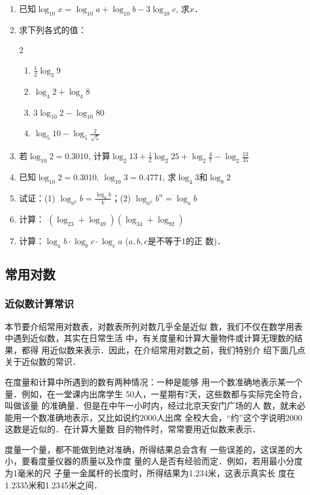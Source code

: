 \begin{enumerate}
\item 已知$\log_{10} x=\log_{10} a+\log_{10} b-3\log_{10} c$, 求$x$．
\item 求下列各式的值：
\begin{multicols}{2}
\begin{enumerate}
    \item $\frac{1}{2}\log_{3} 9$
    \item $\log_{4} 2+\log_{4} 8$
    \item $3\log_{10} 2-\log_{10} 80$
    \item $\log_{5} 10-\log_{5}\frac{2}{\sqrt{5}} $
\end{enumerate}
\end{multicols}
\item 若$\log_{10} 2=0.3010$,
计算$\log_{2} 13+\frac{1}{2}\log_{2} 25+\log_{2} \frac{4}{7}-\log_{2}\frac{13}{35} $
\item 已知$\log_{10} 2=0.3010$, $\log_{10}3=0.4771$,
求$\log_4 3$和$\log_8 2$

\item  试证：(1) $\log_{a^k}b=\frac{\log_ab}{k}$；\quad (2) $\log_{a^n}b^n=\log_ab$

\item 计算：
$(\log_23+\log_49)(\log_34 +\log_92)$
\item 计算：$\log_ab\cdot \log_b c\cdot \log_ca$ ($a,b,c$是不等于1的正
数)．
\end{enumerate}  

\subsection{常用对数}
\subsubsection{近似数计算常识}
本节要介绍常用对数表，对数表所列对数几乎全是近似
数，我们不仅在数学用表中遇到近似数，其实在日常生活
中，有关度量和计算大量物件或计算无理数的结果，都得
用近似数来表示．因此，在介绍常用对数之前，我们特别介
绍下面几点关于近似数的常识．

在度量和计算中所遇到的数有两种情况：一种是能够
用一个数准确地表示某一个量．例如，在一堂课内出席学生
50人，一星期有7天，这些数都与实际完全符合，叫做该量
的准确量．但是在中午一小时内，经过北京天安门广场的人
数，就未必能用一个数准确地表示，又比如说约2000人出席
全校大会，“约”这个字说明2000这数是近似的．在计算大量数
目的物件时，常常要用近似数来表示．

度量一个量，都不能做到绝对准确，所得结果总会含有
一些误差的，这误差的大小，要看度量仪器的质量以及作度
量的人是否有经验而定．例如，若用最小分度为1毫米的尺
子量一金属杆的长度时，所得结果为1.234米，这表示真实长
度在1.2335米和1.2345米之间．

